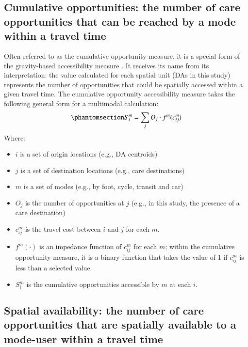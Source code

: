 \documentclass[
  authoryear,
  preprint,
  3p]{elsarticle}
\providecommand{\tightlist}{%
  \setlength{\itemsep}{0pt}\setlength{\parskip}{0pt}}\usepackage{longtable,booktabs,array}
\def\tightlist{}
\begin{document}
\subsection{Cumulative opportunities: the number of care opportunities
that can be reached by a mode within a travel
time}\label{cumulative-opportunities-the-number-of-care-opportunities-that-can-be-reached-by-a-mode-within-a-travel-time}

Often referred to as the cumulative opportunity measure, it is a special
form of the gravity-based accessibility measure
\citep{handyMeasuringAccessibilityExploration1997}. It receives its name
from its interpretation: the value calculated for each spatial unit (DAs
in this study) represents the number of opportunities that could be
spatially accessed within a given travel time. The cumulative
opportunity accessibility measure takes the following general form for a
multimodal calculation: \begin{equation}\phantomsection\label{eq-1}{
S_i^m=\sum_{j}O_j\cdot f^m(c_{ij}^m)
}\end{equation} \noindent Where:

\begin{itemize}
\tightlist
\item
  \(i\) is a set of origin locations (e.g., DA centroids)
\item
  \(j\) is a set of destination locations (e.g., care destinations)
\item
  \(m\) is a set of modes (e.g., by foot, cycle, transit and car)
\item
  \(O_j\) is the number of opportunities at \(j\) (e.g., in this study,
  the presence of a care destination)
\item
  \(c_{ij}^m\) is the travel cost between \(i\) and \(j\) for each
  \(m\).
\item
  \(f^m(\cdot)\) is an impedance function of \(c^m_{ij}\) for each
  \(m\); within the cumulative opportunity measure, it is a binary
  function that takes the value of 1 if \(c^m_{ij}\) is less than a
  selected value.
\item
  \(S^m_{i}\) is the cumulative opportunities accessible by \(m\) at
  each \(i\).
\end{itemize}

\subsection{Spatial availability: the number of care opportunities that
are spatially available to a mode-user within a travel
time}\label{spatial-availability-the-number-of-care-opportunities-that-are-spatially-available-to-a-mode-user-within-a-travel-time}
\end{document}
